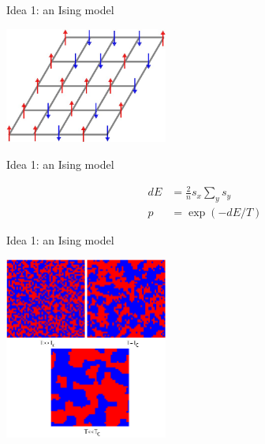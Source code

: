 \documentclass{beamer}
\begin{document}
\begin{frame}{Idea 1: an Ising model}
  \begin{minipage}[t][.7\textheight]{\textwidth}
    \vskip 1cm
    \begin{center}
      \includegraphics[width=0.4\textwidth]{ising.jpg}
    \end{center}
\end{minipage}
\vfill
\color{gray}
\color{black}
\end{frame}


\begin{frame}{Idea 1: an Ising model}
  \begin{minipage}[t][.7\textheight]{\textwidth}
    \vskip 1cm
\begin{align}
dE&=\frac{2}{n}s_x\sum_y s_y\\
p&=\exp{(-dE/T)}
\end{align}
\end{minipage}
\end{frame}


\begin{frame}{Idea 1: an Ising model}
  \begin{minipage}[t][.7\textheight]{\textwidth}
    \vskip 1cm
    \begin{center}
      \includegraphics[width=0.4\textwidth]{phases.png}
    \end{center}
\end{minipage}
\vfill
\color{gray}
\color{black}
\end{frame}
\end{document}
